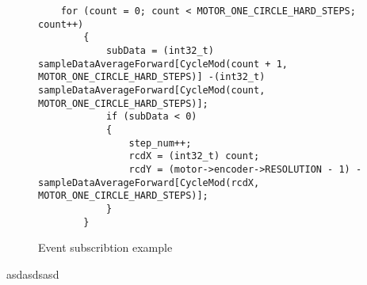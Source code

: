 \begin{figure}[H]
	\centering
	\begin{verbatim}
    for (count = 0; count < MOTOR_ONE_CIRCLE_HARD_STEPS; count++)
        {
            subData = (int32_t) sampleDataAverageForward[CycleMod(count + 1, MOTOR_ONE_CIRCLE_HARD_STEPS)] -(int32_t) sampleDataAverageForward[CycleMod(count, MOTOR_ONE_CIRCLE_HARD_STEPS)];
            if (subData < 0)
            {
                step_num++;
                rcdX = (int32_t) count;
                rcdY = (motor->encoder->RESOLUTION - 1) - sampleDataAverageForward[CycleMod(rcdX, MOTOR_ONE_CIRCLE_HARD_STEPS)];
            }
        }
	\end{verbatim}
	\caption{Event subscribtion example}
\end{figure}

asdasdsasd

% 
